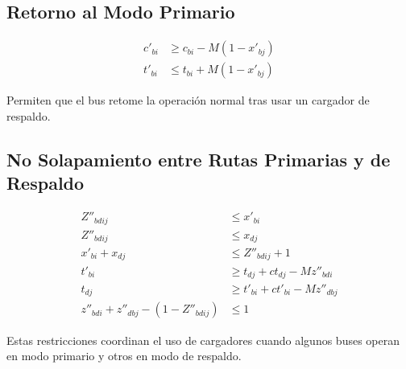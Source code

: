 \documentclass[12pt]{article}
\begin{document}
\subsection{Retorno al Modo Primario}

\begin{align}
c'_{bi} &\geq c_{bi} - M(1 - x'_{bj}) \tag{24} \\
t'_{bi} &\leq t_{bi} + M(1 - x'_{bj}) \tag{25}
\end{align}

Permiten que el bus retome la operación normal tras usar un cargador de respaldo.

\subsection{No Solapamiento entre Rutas Primarias y de Respaldo}

\begin{align}
Z''_{bdij} &\leq x'_{bi} \tag{26} \\
Z''_{bdij} &\leq x_{dj} \tag{27} \\
x'_{bi} + x_{dj} &\leq Z''_{bdij} + 1 \tag{28} \\
t'_{bi} &\geq t_{dj} + ct_{dj} - M z''_{bdi} \tag{29} \\
t_{dj} &\geq t'_{bi} + ct'_{bi} - M z''_{dbj} \tag{30} \\
z''_{bdi} + z''_{dbj} - (1 - Z''_{bdij}) &\leq 1 \tag{31}
\end{align}

Estas restricciones coordinan el uso de cargadores cuando algunos buses operan en modo primario y otros en modo de respaldo.
\end{document}
